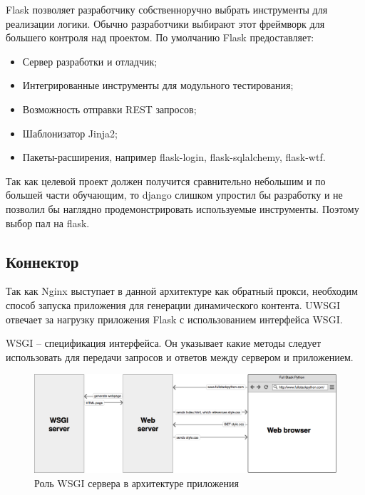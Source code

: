 Flask позволяет разработчику собственноручно выбрать инструменты для реализации
логики. Обычно разработчики выбирают этот фреймворк для большего контроля над
проектом. По умолчанию Flask предоставляет:
\begin{itemize}
    \item Сервер разработки и отладчик;
    \item Интегрированные инструменты для модульного тестирования;
    \item Возможность отправки REST запросов;
    \item Шаблонизатор Jinja2;
    \item Пакеты-расширения, например flask-login, flask-sqlalchemy, flask-wtf.
\end{itemize}

Так как целевой проект должен получится сравнительно небольшим и по большей
части обучающим, то django слишком упростил бы разработку и не позволил бы
наглядно продемонстрировать используемые инструменты. Поэтому выбор пал на
flask.

\subsection{Коннектор}
Так как Nginx выступает в данной архитектуре как обратный прокси, необходим
способ запуска приложения для генерации динамического контента. UWSGI отвечает
за нагрузку приложения Flask с использованием интерфейса WSGI.

WSGI -- спецификация интерфейса. Он указывает какие методы следует использовать
для передачи запросов и ответов между сервером и приложением.

\begin{figure}[H]
    \centering
    \includegraphics[scale=0.35]{inc/img/web-browser-server-wsgi.png}
    \caption{Роль WSGI сервера в архитектуре приложения}
\end{figure}

